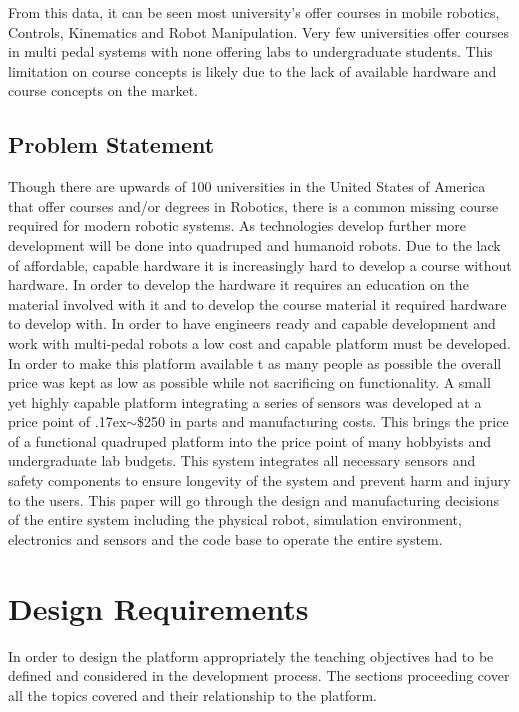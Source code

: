 \documentclass[conference]{IEEEtran}
\newcommand{\approximately}{{\raise.17ex\hbox{$\scriptstyle\mathtt{\sim}$}}}
\begin{document}
From this data, it can be seen most university's offer courses in mobile robotics, Controls, Kinematics and Robot Manipulation. Very few universities offer courses in multi pedal systems with none offering labs to undergraduate students. This limitation on course concepts is likely due to the lack of available hardware and course concepts on the market. 

\subsection{Problem Statement}
Though there are upwards of 100 universities in the United States of America that offer courses and/or degrees in Robotics, there is a common missing course required for modern robotic systems. As technologies develop further more development will be done into quadruped and humanoid robots. Due to the lack of affordable, capable hardware it is increasingly hard to develop a course without hardware. In order to develop the hardware it requires an education on the material involved with it and to develop the course material it required hardware to develop with. In order to have engineers ready and capable development and work with multi-pedal robots a low cost and capable platform must be developed. 
In order to make this platform available t as many people as possible the overall price was kept as low as possible while not sacrificing on functionality. A small yet highly capable platform integrating a series of sensors was developed at a price point of \approximately\$250 in parts and manufacturing costs. This brings the price of a functional quadruped platform into the price point of many hobbyists and undergraduate lab budgets. This system integrates all necessary sensors and safety components to ensure longevity of the system and prevent harm and injury to the users. This paper will go through the design and manufacturing decisions of the entire system including the physical robot, simulation environment, electronics and sensors and the  code base to operate the entire system.


\section{Design Requirements}\label{sec:DesignReqs}
In order to design the platform appropriately the teaching objectives had to be defined and considered in the development process. The sections proceeding cover all the topics covered and their relationship to the platform.
\end{document}
